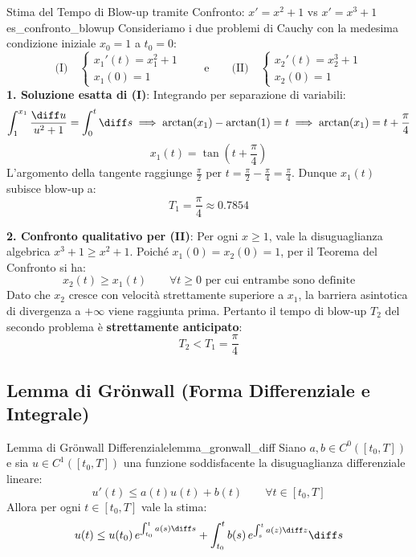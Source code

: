 \begin{esempio}{Stima del Tempo di Blow-up tramite Confronto: $x' = x^2+1$ vs $x' = x^3+1$}{es_confronto_blowup}
Consideriamo i due problemi di Cauchy con la medesima condizione iniziale $x_0 = 1$ a $t_0 = 0$:
\[
    \text{(I)} \quad \begin{cases} x_1'(t) = x_1^2 + 1 \\ x_1(0) = 1 \end{cases} \qquad \text{e} \qquad \text{(II)} \quad \begin{cases} x_2'(t) = x_2^3 + 1 \\ x_2(0) = 1 \end{cases}
\]
\textbf{1. Soluzione esatta di (I)}:
Integrando per separazione di variabili:
\[
    \int_1^{x_1} \frac{\diff u}{u^2+1} = \int_0^t \diff s \implies \arctan(x_1) - \arctan(1) = t \implies \arctan(x_1) = t + \frac{\pi}{4}
\]
\[
    x_1(t) = \tan\left( t + \frac{\pi}{4} \right)
\]
L'argomento della tangente raggiunge $\frac{\pi}{2}$ per $t = \frac{\pi}{2} - \frac{\pi}{4} = \frac{\pi}{4}$. Dunque $x_1(t)$ subisce blow-up a:
\[
    T_1 = \frac{\pi}{4} \approx 0.7854
\]

\textbf{2. Confronto qualitativo per (II)}:
Per ogni $x \ge 1$, vale la disuguaglianza algebrica $x^3 + 1 \ge x^2 + 1$.
Poiché $x_1(0) = x_2(0) = 1$, per il Teorema del Confronto si ha:
\[
    x_2(t) \ge x_1(t) \qquad \forall t \ge 0 \text{ per cui entrambe sono definite}
\]
Dato che $x_2$ cresce con velocità strettamente superiore a $x_1$, la barriera asintotica di divergenza a $+\infty$ viene raggiunta prima. Pertanto il tempo di blow-up $T_2$ del secondo problema è \textbf{strettamente anticipato}:
\[
    T_2 < T_1 = \frac{\pi}{4}
\]
\end{esempio}

\subsection{Lemma di Grönwall (Forma Differenziale e Integrale)}

\begin{teorema}{Lemma di Grönwall Differenziale}{lemma_gronwall_diff}
Siano $a, b \in C^0([t_0, T])$ e sia $u \in C^1([t_0, T])$ una funzione soddisfacente la disuguaglianza differenziale lineare:
\begin{equation}
    \label{eq:gronwall_diff}
    u'(t) \le a(t) u(t) + b(t) \qquad \forall t \in [t_0, T]
\end{equation}
Allora per ogni $t \in [t_0, T]$ vale la stima:
\begin{equation}
    \label{eq:gronwall_diff_tesi}
    u(t) \le u(t_0)\, e^{\int_{t_0}^t a(s) \diff s} + \int_{t_0}^t b(s)\, e^{\int_s^t a(z) \diff z} \diff s
\end{equation}
\end{teorema}

